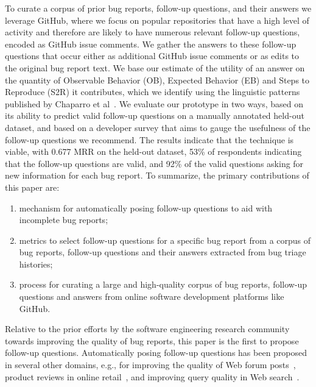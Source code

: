 To curate a corpus of prior bug reports, follow-up questions, and their answers we leverage GitHub, where we focus on popular repositories that have a high level of activity and therefore are likely to have numerous relevant follow-up questions, encoded as GitHub issue comments. We gather the answers to these follow-up questions that occur either as additional GitHub issue comments or as edits to the original bug report text. We base our estimate of the utility of an answer on the quantity of Observable Behavior (OB), Expected Behavior (EB) and Steps to Reproduce (S2R) it contributes, which we identify using the linguistic patterns published by Chaparro et al~\cite{chaparro17detecting}. We evaluate our prototype in two ways, based on its ability to predict valid follow-up questions on a manually annotated held-out dataset, and based on a developer survey that aims to gauge the usefulness of the follow-up questions we recommend. The results indicate that the technique is viable, with 0.677 MRR on the held-out dataset, 53\% of respondents indicating that the follow-up questions are valid, and 92\% of the valid questions asking for new information for each bug report. To summarize, the primary contributions of this paper are:

\begin{enumerate}
\item mechanism for automatically posing follow-up questions to aid with incomplete bug reports;
\item metrics to select follow-up questions for a specific bug report from a corpus of bug reports, follow-up questions and their answers extracted from bug triage histories;
\item process for curating a large and high-quality corpus of bug reports, follow-up questions and answers from online software development platforms like GitHub.
\end{enumerate}

Relative to the prior efforts by the software engineering research community towards improving the quality of bug reports, this paper is the first to propose follow-up questions. Automatically posing follow-up questions has been proposed in several other domains, e.g.,  for improving the quality of Web forum posts~\cite{rao-daume-iii-2018-learning}, product reviews in online retail~\cite{rao2019answer}, and improving query quality in Web search~\cite{10.1145/3366423.3380126}.

%
